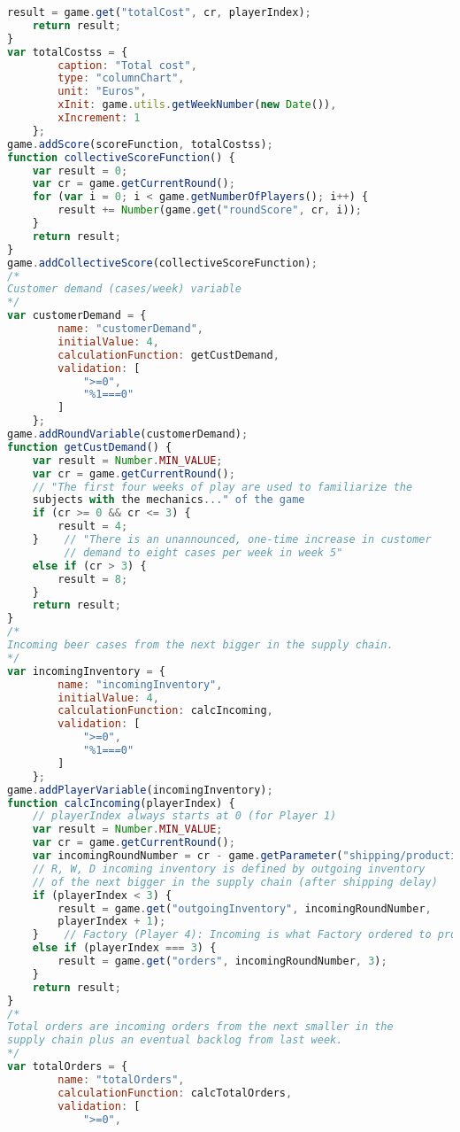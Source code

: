 \begin{lstlisting}[language=Javascript, caption=Game code of the beergame, label=lst:beergame]
    result = game.get("totalCost", cr, playerIndex);
    return result;
}
var totalCostss = {
        caption: "Total cost",
        type: "columnChart",
        unit: "Euros",
        xInit: game.utils.getWeekNumber(new Date()),
        xIncrement: 1
    };
game.addScore(scoreFunction, totalCostss);
function collectiveScoreFunction() {
    var result = 0;
    var cr = game.getCurrentRound();
    for (var i = 0; i < game.getNumberOfPlayers(); i++) {
        result += Number(game.get("roundScore", cr, i));
    }
    return result;
}
game.addCollectiveScore(collectiveScoreFunction);
/*
Customer demand (cases/week) variable
*/
var customerDemand = {
        name: "customerDemand",
        initialValue: 4,
        calculationFunction: getCustDemand,
        validation: [
            ">=0",
            "%1===0"
        ]
    };
game.addRoundVariable(customerDemand);
function getCustDemand() {
    var result = Number.MIN_VALUE;
    var cr = game.getCurrentRound();
    // "The first four weeks of play are used to familiarize the
    subjects with the mechanics..." of the game
    if (cr >= 0 && cr <= 3) {
        result = 4;
    }    // "There is an unannounced, one-time increase in customer
         // demand to eight cases per week in week 5"
    else if (cr > 3) {
        result = 8;
    }
    return result;
}
/*
Incoming beer cases from the next bigger in the supply chain.
*/
var incomingInventory = {
        name: "incomingInventory",
        initialValue: 4,
        calculationFunction: calcIncoming,
        validation: [
            ">=0",
            "%1===0"
        ]
    };
game.addPlayerVariable(incomingInventory);
function calcIncoming(playerIndex) {
    // playerIndex always starts at 0 (for Player 1)
    var result = Number.MIN_VALUE;
    var cr = game.getCurrentRound();
    var incomingRoundNumber = cr - game.getParameter("shipping/productionDelay");
    // R, W, D incoming inventory is defined by outgoing inventory
    // of the next bigger in the supply chain (after shipping delay)
    if (playerIndex < 3) {
        result = game.get("outgoingInventory", incomingRoundNumber,
        playerIndex + 1);
    }    // Factory (Player 4): Incoming is what Factory ordered to produce 
    else if (playerIndex === 3) {
        result = game.get("orders", incomingRoundNumber, 3);
    }
    return result;
}
/*
Total orders are incoming orders from the next smaller in the 
supply chain plus an eventual backlog from last week.
*/
var totalOrders = {
        name: "totalOrders",
        calculationFunction: calcTotalOrders,
        validation: [
            ">=0",

\end{lstlisting}
